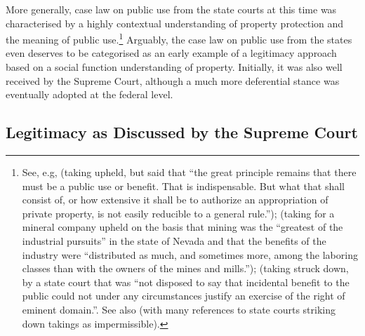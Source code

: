 More generally, case law on public use from the state courts at this time was characterised by a highly contextual understanding of property protection and the meaning of public use.\footnote{See, e.g, \cite{scudder32} (taking upheld, but said that ``the great principle remains that there must be a public use or benefit. That is indispensable. But what that shall consist of, or how extensive it shall be to authorize an appropriation of private property, is not easily reducible to a general rule.'');  \cite[409]{seawell76} (taking for a mineral company upheld on the basis that mining was the ``greatest of the industrial pursuits'' in the state of Nevada and that the benefits of the industry were ``distributed as much, and sometimes more, among the laboring classes than with the owners of the mines and mills.''); \cite[337]{ryerson77} (taking struck down, by a state court that was ``not disposed to say that incidental benefit to the public could not under any circumstances justify an exercise of the right of eminent domain.''. See also \cite{gray11} (with many references to state courts striking down takings as impermissible).} Arguably, the case law on public use from the states even deserves to be categorised as an early example of a legitimacy approach based on a social function understanding of property. Initially, it was also well received by the Supreme Court, although a much more deferential stance was eventually adopted at the federal level.

\subsection{Legitimacy as Discussed by the Supreme Court}\label{sec:3:3:1}

